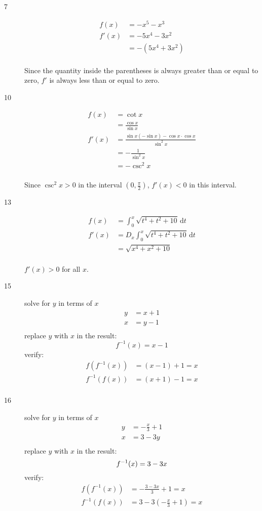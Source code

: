 \documentclass{exam}
\begin{document}
\begin{description}
\item[7]
\begin{align*}
  f(x)  &= -x^5 - x^3 \\
  f'(x) &= -5x^4 - 3x^2 \\
        &= -(5x^4 + 3x^2) \\
\end{align*}

Since the quantity inside the parentheses is always greater than or equal to zero, $f'$ is always less than or equal to
zero.

\item[10]
\begin{align*}
  f(x)  &= \cot x \\
        &= \frac{\cos x}{\sin x} \\
  f'(x) &= \frac{\sin x (- \sin x) - \cos x \cdot \cos x}{\sin^2 x} \\
        &= -\frac{1}{\sin^2 x} \\
        &= -\csc^2 x \\
\end{align*}

Since $\csc^2 x > 0$ in the interval $\left(0, \frac{\pi}{2} \right)$, $f'(x) < 0$ in this interval.

\item[13]
\begin{align*}
  f(x)  &= \int_0^x \sqrt{t^4 + t^2 + 10}\, \mathrm{d}t \\
  f'(x) &= D_x \int_0^x \sqrt{t^4 + t^2 + 10}\, \mathrm{d}t \\
        &= \sqrt{x^4 + x^2 + 10} \\
\end{align*}

$f'(x) > 0$ for all $x$.

\item[15]
solve for $y$ in terms of $x$
\begin{align*}
  y &= x + 1 \\
  x &= y - 1 \\
\end{align*}
replace $y$ with $x$ in the result:
\[
  f^{-1}(x) = x - 1
\]
verify:
\begin{align*}
  f(f^{-1}(x)) &= (x - 1) + 1 = x \\
  f^{-1}(f(x)) &= (x + 1) - 1 = x \\
\end{align*}

\item[16]
solve for $y$ in terms of $x$
\begin{align*}
  y &= - \frac{x}{3} + 1 \\
  x &= 3 - 3y \\
\end{align*}
replace $y$ with $x$ in the result:
\[
  f^{-1}(x) = 3 - 3x \\
\]
verify:
\begin{align*}
  f(f^{-1}(x))  &= - \frac{3 - 3x}{3} + 1 = x \\
  f^{-1}(f(x)) &= 3 - 3 \left( - \frac{x}{3} + 1 \right) = x \\  
\end{align*}


\end{description}
\end{document}
